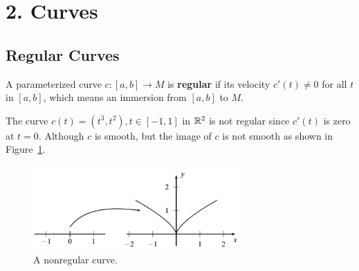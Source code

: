 
\section[Lecture 2--{Curves}]{2. Curves}

\subsection{Regular Curves}
\begin{definition}
    A parameterized curve $c: [a, b] \rightarrow M$ is \textbf{regular}
     if its velocity $c'(t)\neq 0$ for all $t$ in $[a, b]$, which means an immersion from
     $[a, b]$ to $M$.
\end{definition}
\begin{example}
    The curve $c(t)=(t^3, t^2), t\in [-1, 1]$ in ${\mathbb{R}}^2$ is not regular since $c'(t)$ is zero
    at $t=0$. 
    Although $c$ is smooth, but the image of $c$ is not smooth as shown 
    in Figure~\ref{fig. t3t2 image}.
\end{example}
\begin{figure}[htb]
    \centering
    \includegraphics[width=0.7\textwidth]{../Lectures/Figures/image.png}
    \caption{A nonregular curve.}
    \label{fig. t3t2 image}
\end{figure}
